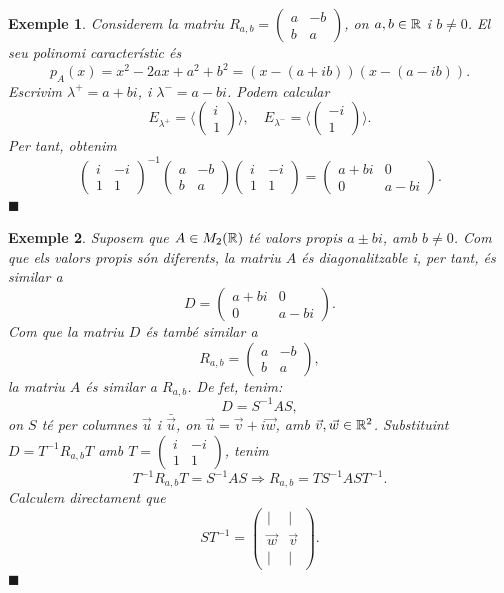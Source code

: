 \documentclass[
  11pt,
]{book}
\numberwithin{dummy}{section}
\theoremstyle{maincolornumbox}
\theoremstyle{blacknumex}
\newtheorem{exampleT}{Exemple}[chapter]
\theoremstyle{blacknumbox}
\theoremstyle{maincolornum}
\newenvironment{example}{\begin{exampleT}}{\hfill{\tiny\ensuremath{\blacksquare}}\end{exampleT}}
\begin{document}
\begin{example}
Considerem la matriu \(R_{a,b}=\begin{pmatrix}a&-b\\b&a\end{pmatrix}\), on
\(a, b\in\mathbb{R}\) i \(b\neq 0\). El seu polinomi característic és
\[p_A(x) = x^2-2ax +a^2+b^2 = (x-(a+ib))(x-(a-ib)).\] Escrivim
\(\lambda^+= a+bi\), i \(\lambda^- = a-bi\). Podem calcular
\[E_{\lambda^+} = \langle \begin{pmatrix}i\\1\end{pmatrix}\rangle, \quad E_{\lambda^-} = \langle \begin{pmatrix}-i\\1\end{pmatrix}\rangle.\]
Per tant, obtenim \[\begin{pmatrix}
i & -i\\1 & 1
\end{pmatrix}^{-1}
\begin{pmatrix}
a&-b\\b&a
\end{pmatrix}
\begin{pmatrix}
i & -i\\1 & 1
\end{pmatrix}
=
\begin{pmatrix}
a+bi&0\\0&a-bi
\end{pmatrix}.\]
\end{example}

\begin{example}
Suposem que \(A\in M_2(\mathbb{R})\) té valors propis \(a\pm bi\), amb \(b\neq 0\).
Com que els valors propis són diferents, la matriu \(A\) és
diagonalitzable i, per tant, és similar a \[D = \begin{pmatrix}
a+bi&0\\0&a-bi
\end{pmatrix}.\] Com que la matriu \(D\) és també similar a
\[R_{a,b} = \begin{pmatrix}
a&-b\\b&a
\end{pmatrix},\] la matriu \(A\) és similar a \(R_{a,b}\). De fet, tenim:
\[D = S^{-1} A S,\] on \(S\) té per columnes \(\vec u\) i \(\bar \vec u\), on
\(\vec u = \vec v + i \vec w\), amb \(\vec v,\vec w\in \mathbb{R}^2\). Substituint
\(D = T^{-1} R_{a,b} T\) amb \(T = \begin{pmatrix} i & -i\\1 & 1 \end{pmatrix}\), tenim
\[T^{-1} R_{a,b} T = S^{-1} A S\Longrightarrow R_{a,b} = TS^{-1} A ST^{-1}.\]
Calculem directament que \[ST^{-1} = \begin{pmatrix}
\vert&\vert\\
\vec w&\vec v\\
\vert&\vert
\end{pmatrix}.\]
\end{example}
\end{document}
